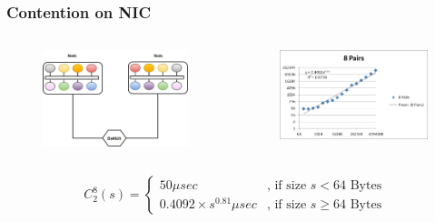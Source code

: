 \documentclass{beamer}
\begin{document}

\begin{frame}
\frametitle{Contention on NIC}
\begin{columns}[c]

\begin{figure}
\includegraphics[width=\linewidth,height=\textheight,keepaspectratio]{nodes2p8.jpg}
\end{figure}

\begin{figure}
\includegraphics[width=\linewidth,height=\textheight,keepaspectratio]{picture2.jpg}
\end{figure}

\end{columns}

\begin{block}{}
\begin{equation*}
C_2 ^8(s)=\begin{cases}
50 \mu sec & \text{, if size }s < 64 \text{ Bytes} \\
0.4092\times s^{0.81} \mu sec & \text{, if size } s \geq 64 \text{ Bytes}
\end{cases}
\end{equation*}
\end{block}

\end{frame}
\end{document}
